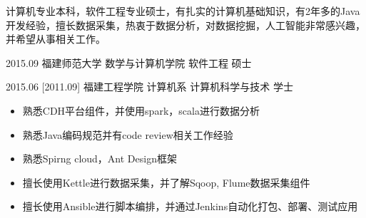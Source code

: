 \documentclass[zh]{resume}
\begin{document}
\makeheader

{\onehalfspacing\hspace{2em}%
计算机专业本科，软件工程专业硕士，有扎实的计算机基础知识，有2年多的Java开发经验，擅长数据采集，热衷于数据分析，对数据挖掘，人工智能非常感兴趣，并希望从事相关工作。
\par}

\begin{competences}
\end{competences}

\begin{educations}
    \education%
    {2015.09}%
    {福建师范大学}%
    {数学与计算机学院}%
    {软件工程}%
    {硕士}

  \separator{0.5ex}
  \education%
    {2015.06}%
    [2011.09]%
    {福建工程学院}%
    {计算机系}%
    {计算机科学与技术}%
    {学士}
\end{educations}

\begin{itemize}
  \item 熟悉CDH平台组件，并使用spark，scala进行数据分析
  \item 熟悉Java编码规范并有code review相关工作经验
  \item 熟悉Spirng cloud，Ant Design框架
  \item 擅长使用Kettle进行数据采集，并了解Sqoop, Flume数据采集组件
  \item 擅长使用Ansible进行脚本编排，并通过Jenkins自动化打包、部署、测试应用
\end{itemize}
\end{document}
